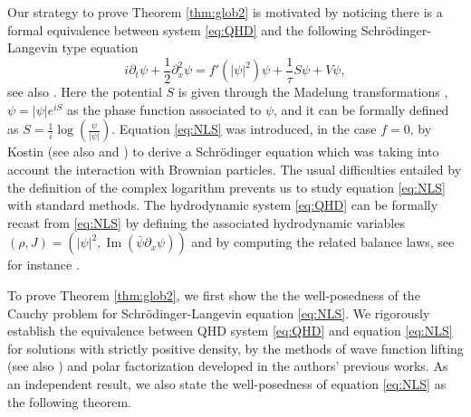 \documentclass[leqno]{amsart}
\theoremstyle{plain}
\theoremstyle{definition}
\theoremstyle{remark}
\theoremstyle{plain}
\theoremstyle{plain}
\def\d{{\partial}}
\DeclareMathOperator{\IM}{Im}
\numberwithin{equation}{section}
\begin{document}
Our strategy to prove Theorem \ref{thm:glob2} is motivated by noticing there is a formal equivalence between system \eqref{eq:QHD} and the following Schr\"odinger-Langevin type equation 
\begin{equation}\label{eq:NLS}
i\d_t\psi+\frac12\d_x^2\psi=f'(|\psi|^2)\psi+\frac{1}{\tau}S\psi+V\psi,
\end{equation}
see also \cite{JMR}.
Here the potential $S$ is given through the Madelung transformations \cite{Mad}, $\psi=|\psi|e^{iS}$ as the phase function associated to $\psi$, and it can be formally defined as $S=\frac{1}{i}\log\left(\frac{\psi}{|\psi|}\right)$.
Equation \eqref{eq:NLS} was introduced, in the case $f=0$, by Kostin \cite{Kos} (see also \cite{Y} and \cite{Na}) to derive a Schr\"odinger equation which was taking into account the interaction with Brownian particles. 
The usual difficulties entailed by the definition of the complex logarithm prevents us to study equation \eqref{eq:NLS} with standard methods.
\newline
The hydrodynamic system \eqref{eq:QHD} can be formally recast from \eqref{eq:NLS} by defining the associated hydrodynamic variables  $(\rho, J)=(|\psi|^2, \IM(\bar\psi\d_x\psi))$ and by computing the related balance laws, see for instance \cite{AMZ1}.


To prove Theorem \ref{thm:glob2}, we first show the the well-posedness of the Cauchy problem for Schr\"odinger-Langevin equation \eqref{eq:NLS}. We rigorously establish the equivalence between QHD system \eqref{eq:QHD} and equation \eqref{eq:NLS} for solutions with strictly positive density, by the methods of wave function lifting \cite{AMZ1} (see also \cite{HaoMinE}) and polar factorization \cite{AM1} developed in the authors' previous works. As an independent result, we also state the well-posedness of equation \eqref{eq:NLS} as the following theorem.
\end{document}
